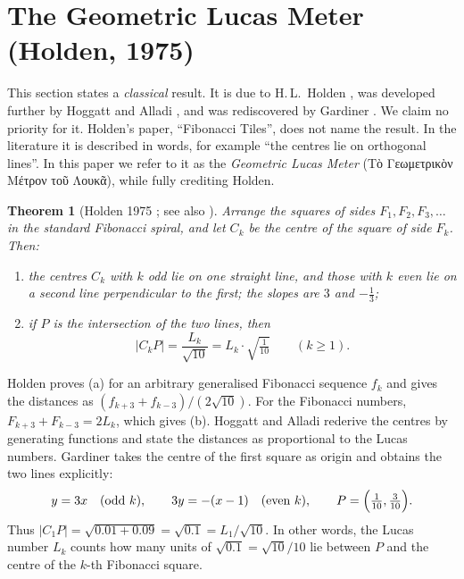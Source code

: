 \documentclass[11pt,a4paper]{article}
\newcommand{\gr}[1]{{\greekfont #1}}                 %
\theoremstyle{plain}
\newtheorem{theorem}{Theorem}[section]
\theoremstyle{definition}
\theoremstyle{remark}
\begin{document}
\section{The Geometric Lucas Meter (Holden, 1975)}\label{sec:holden}

This section states a \emph{classical} result. It is due to H.\,L.~Holden \cite{Holden1975}, was developed further by Hoggatt and Alladi \cite{HoggattAlladi1975}, and was rediscovered by Gardiner \cite{Gardiner1984}. We claim no priority for it. Holden's paper, “Fibonacci Tiles”, does not name the result. In the literature it is described in words, for example “the centres lie on orthogonal lines”. In this paper we refer to it as the \emph{Geometric Lucas Meter} (\gr{Τὸ Γεωμετρικὸν Μέτρον τοῦ Λουκᾶ}), while fully crediting Holden.

\begin{theorem}[Holden 1975 \cite{Holden1975}; see also \cite{HoggattAlladi1975,Gardiner1984}]\label{thm:holden}
Arrange the squares of sides $F_1,F_2,F_3,\dots$ in the standard Fibonacci spiral, and let $C_k$ be the centre of the square of side $F_k$. Then:
\begin{enumerate}[label=(\alph*),itemsep=1pt]
  \item the centres $C_k$ with $k$ odd lie on one straight line, and those with $k$ even lie on a second line perpendicular to the first; the slopes are $3$ and $-\tfrac13$;
  \item if $P$ is the intersection of the two lines, then
  \[
    |C_kP|=\frac{L_k}{\sqrt{10}}=L_k\cdot\sqrt{\tfrac{1}{10}}\qquad(k\ge1).
  \]
\end{enumerate}
\end{theorem}

Holden \cite{Holden1975} proves (a) for an arbitrary generalised Fibonacci sequence $f_k$ and gives the distances as $(f_{k+3}+f_{k-3})/(2\sqrt{10})$. For the Fibonacci numbers, $F_{k+3}+F_{k-3}=2L_k$, which gives (b). Hoggatt and Alladi \cite{HoggattAlladi1975} rederive the centres by generating functions and state the distances as proportional to the Lucas numbers. Gardiner \cite{Gardiner1984} takes the centre of the first square as origin and obtains the two lines explicitly:
\[
  y=3x\quad(\text{odd }k),\qquad 3y=-(x-1)\quad(\text{even }k),\qquad P=\Bigl(\tfrac1{10},\tfrac3{10}\Bigr).
\]
Thus $|C_1P|=\sqrt{0.01+0.09}=\sqrt{0.1}=L_1/\sqrt{10}$. In other words, the Lucas number $L_k$ counts how many units of $\sqrt{0.1}=\sqrt{10}/10$ lie between $P$ and the centre of the $k$-th Fibonacci square.
\end{document}
